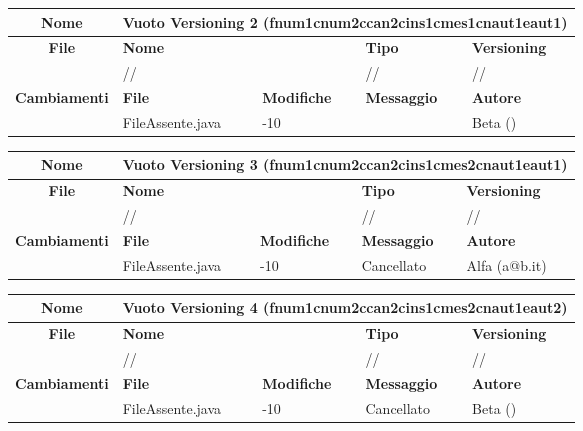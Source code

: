 \begin{table}[ht]
\footnotesize
\begin{tabular}{|c|p{2.5cm}|p{2cm}|p{2.5cm}|p{2.5cm}|}
  \hline
  \textbf{Nome}	& \multicolumn{4}{l|}{Vuoto Versioning 2 (fnum1cnum2ccan2cins1cmes1cnaut1eaut1)} 							\\
  \hline
  \rowcolor{lightgray}\textbf{File} 		& \multicolumn{2}{l|}{\textbf{Nome}}		& \textbf{Tipo}		& \textbf{Versioning} 		\\
						\cline{2-5}
						& \multicolumn{2}{l|}{//}			& //			& //				\\
  \hline
  \rowcolor{lightgray}\textbf{Cambiamenti}	& \textbf{File}		&\textbf{Modifiche}	& \textbf{Messaggio}	& \textbf{Autore}		\\
						\cline{2-5}
						& FileAssente.java	& -10	  		& 			& Beta ()			\\
  \hline
\end{tabular}
\end{table}

\begin{table}[ht]
\footnotesize
\begin{tabular}{|c|p{2.5cm}|p{2cm}|p{2.5cm}|p{2.5cm}|}
  \hline
  \textbf{Nome}	& \multicolumn{4}{l|}{Vuoto Versioning 3 (fnum1cnum2ccan2cins1cmes2cnaut1eaut1)} 							\\
  \hline
  \rowcolor{lightgray}\textbf{File} 		& \multicolumn{2}{l|}{\textbf{Nome}}		& \textbf{Tipo}		& \textbf{Versioning} 		\\
						\cline{2-5}
						& \multicolumn{2}{l|}{//}			& //			& //				\\
  \hline
  \rowcolor{lightgray}\textbf{Cambiamenti}	& \textbf{File}		&\textbf{Modifiche}	& \textbf{Messaggio}	& \textbf{Autore}		\\
						\cline{2-5}
						& FileAssente.java	& -10	  		& Cancellato		& Alfa (a@b.it)			\\
  \hline
\end{tabular}
\end{table}

\begin{table}[ht]
\footnotesize
\begin{tabular}{|c|p{2.5cm}|p{2cm}|p{2.5cm}|p{2.5cm}|}
  \hline
  \textbf{Nome}	& \multicolumn{4}{l|}{Vuoto Versioning 4 (fnum1cnum2ccan2cins1cmes2cnaut1eaut2)} 							\\
  \hline
  \rowcolor{lightgray}\textbf{File} 		& \multicolumn{2}{l|}{\textbf{Nome}}		& \textbf{Tipo}		& \textbf{Versioning} 		\\
						\cline{2-5}
						& \multicolumn{2}{l|}{//}			& //			& //				\\
  \hline
  \rowcolor{lightgray}\textbf{Cambiamenti}	& \textbf{File}		&\textbf{Modifiche}	& \textbf{Messaggio}	& \textbf{Autore}		\\
						\cline{2-5}
						& FileAssente.java	& -10	  		& Cancellato		& Beta ()			\\
  \hline
\end{tabular}
\end{table}




